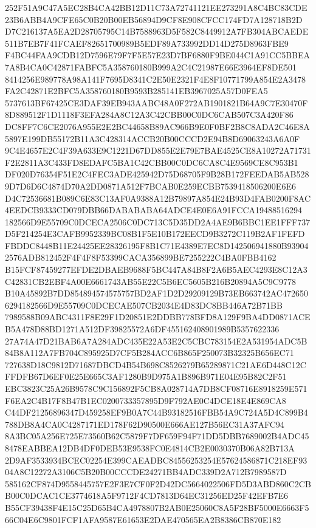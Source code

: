 \documentclass[UTF8,fontset=fandol,zihao=-4,a4paper]{ctexart}
\begin{document}
{{252F51A9C47A5EC28B4CA42BB12D11C73A72741121EE273291A8C4BC83CDE23B6ABB4A9CFE65C0B20B00EB56894D9CF8E908CFCC174FD7A128718B2D
D7C216137A5EA2D28705795C14B7588963D5F582C8449912A7FB304ABCAEDE511B7EB7F41FCAEF82651700989B5EDF89A733992DD14D275D8963FBE9
F4BC44FAA9CDB12D7596E79F7F5E57E23D7BF6880F9BE044C1A91CC5BBEA7A8B4CA0C42871FABFC5A358760180B999A2C4C21987E66E3964EF8DE501
8414256E989778A98A141F7695D8341C2E50E2321F4E8F10771799A854E2A3478FA2C42871E2BFC5A358760180B9593B285141EB3967025A57D0FEA5
5737613BF67425CE3DAF39EB943AABC48A0F272AB1901821B64A9C7E30470F8D889512F1D1118F3EFA284A8C12A3C42CBB00C0DC6CAB507C3A420F86
DC8FF7C6CE2076A955E2E2BC44658B89AC966B9E0F0BF2B8C8ADA2C46E8A5897E199DB55172B11A3C428314ACCB20B00CCCD2E94B8D69063243A6A0F
9C4E4657E2C4F39A633E9C1221D67DD855E2E79E7BAE4525CE8A10272A71731F2E2811A3C433FD8EDAFC5BA1C42CBB00C0DC6CA8C4E9569CE8C953B1
DF020D76354F51E2C4FEC3ADE425942D75D68705F9B28B172FEEDAB5AB5289D7D6D6C4874D70A2DD0871A512F7BCAB0E259ECBB7539418506200E6E6
D4C72536681B089C6E83C13AF0A9388A12B79897A854E24B93D4FAB0200F8AC4EEDCB9333CD079DBB66DABABABA64ADCE4E0E6A91FCCA19488516294
182566D9E55709C0DCECA2506C0DC713C5D35DD2A4AE9B6BBC1EE1FFF737D5F214254E3CAFB9952339BC08B1F5E10B172EECD9B3272C119B2AF1FEFD
FBDDC8448B11E24425EE28326195F8B1C71E4389E7EC8D142506941880B939042576ADB812452F4F4F8F53399CACA356899BE7255222C4BA0FBB4162
B15FCF87459277EFDE2DBAEB9688F5BC447A84B8F2A6B5AEC4293E8C12A3C42831CB2EBF4A00E6661743AB55E22C5B6EC5605B216B20894A5C9C9778
B10A45892B7DD854894574575757BD2AF1D2D29209129B73EB663742AC4726506294182566D9E55709C0DCECAE507CB2034E4D83DC8BB446A72B71BB
7989588B09ABC4311F8E29F1D20851E2DDBB778BFD8A129F9BA4DD0871ACEB5A478D88BD1271A512DF39825572A6DF455162408901989B5357622336
27A74A47D21BAB6A7A284ADC435E22A53E2C5CBC783154E2A531954ADC5B84B8A112A7FB704C895925D7CF5B284ACC6B865F250073B32325B656EC71
727638D18C9812D71687DBCD4B54B698C8526279B65289871C21AE6D448C12CFFDFB67D6EF0E25E665C3AF1280B9D975A1B896B971E04E95B82C2F51
EBC3823C25A26B9578C9C156892F5CB8A028714A7DB8CF08716E8918259E571F6EA2C4B17F8B47B1EC0200733357895D9F792AE0C4DCE18E4E869CA8
C44DF21256896347D459258EF9B0A7C44B93182516FBB54A9C724A5D4C899B4788DB8A4CA0C4287171ED178F62D90500E666AE127B56EC31A37AFC94
8A3BC05A256E725E73560B62C5879F7DF659F94F71DD5DBB7689002B4ADC458478EABBEA12DB4DF0DEB53E9538FC0E4814CB2E0030370B06A82B713A
2D9AF3533934BCEC02254E399CAEADBC84556253254E57624586871C218EF9304A8C12272A3106C5B20B00CCCDE24271BB4ADC339D2A712B7989587D
585162CF874D9558445757E2F3E7CF0F2D42DC5664022506FD5D3ABD860C2CBB00C0DCAC1CE3774618A5F9712F4CD7813D64EC31256ED25F42EFB7E6
B55CF39438F4E15C25D65B4CA4978807B2AB0E25060C8A5F28BF5000E6663F566C04E6C9801FCF1AFA9587E61653E2DAE470565EA2B8386CB870E182
}}
\end{document}
